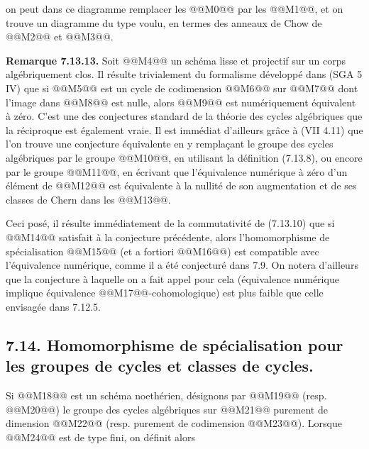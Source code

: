 
on peut dans ce diagramme remplacer les @@M0@@ par les @@M1@@, et on trouve un diagramme du type voulu, en termes des anneaux de Chow de @@M2@@ et @@M3@@.

\textbf{Remarque 7.13.13.} Soit @@M4@@ un schéma lisse et projectif sur un corps algébriquement clos. Il résulte trivialement du formalisme développé dans (SGA 5 IV) que si @@M5@@ est un cycle de codimension @@M6@@ sur @@M7@@ dont l'image dans @@M8@@ est nulle, alors @@M9@@ est numériquement équivalent à zéro. C'est une des conjectures standard de la théorie des cycles algébriques que la réciproque est également vraie. Il est immédiat d'ailleurs grâce à (VII 4.11) que l'on trouve une conjecture équivalente en y remplaçant le groupe des cycles algébriques par le groupe @@M10@@, en utilisant la définition (7.13.8), ou encore par le groupe @@M11@@, en écrivant que l'équivalence numérique à zéro d'un élément de @@M12@@ est équivalente à la nullité de son augmentation et de ses classes de Chern dans les @@M13@@.

Ceci posé, il résulte immédiatement de la commutativité de (7.13.10) que si @@M14@@ satisfait à la conjecture précédente, alors l'homomorphisme de spécialisation @@M15@@ (et a fortiori @@M16@@) est compatible avec l'équivalence numérique, comme il a été conjecturé dans 7.9. On notera d'ailleurs que la conjecture à laquelle on a fait appel pour cela (équivalence numérique implique équivalence @@M17@@-cohomologique) est plus faible que celle envisagée dans 7.12.5.

\subsection*{7.14. Homomorphisme de spécialisation pour les groupes de cycles et classes de cycles.}
Si @@M18@@ est un schéma noethérien, désignons par @@M19@@ (resp. @@M20@@) le groupe des cycles algébriques sur @@M21@@ purement de dimension @@M22@@ (resp. purement de codimension @@M23@@). Lorsque @@M24@@ est de type fini, on définit alors
